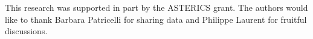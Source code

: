 \documentclass[a0,portrait]{a0poster}
\begin{document}
\begin{multicols}{2}



\vspace{10mm}

{\footnotesize 
  This research was supported in part by the ASTERICS grant. The authors would like to thank Barbara Patricelli for sharing data and Philippe Laurent for fruitful discussions. }




\end{multicols}
\end{document}
